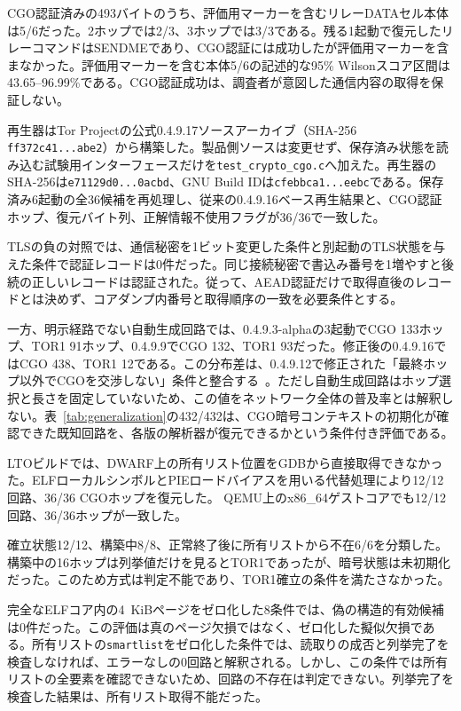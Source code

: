 \documentclass[10pt,a4paper]{ltjsarticle}
\newcommand{\code}[1]{\nolinkurl{#1}}
\newcommand{\torone}{\textsc{TOR1}}
\begin{document}
CGO認証済みの493バイトのうち、評価用マーカーを含むリレーDATAセル本体は5/6だった。2ホップでは2/3、3ホップでは3/3である。残る1起動で復元したリレーコマンドはSENDMEであり、CGO認証には成功したが評価用マーカーを含まなかった。評価用マーカーを含む本体5/6の記述的な95\% Wilsonスコア区間は43.65--96.99\%である。CGO認証成功は、調査者が意図した通信内容の取得を保証しない。

再生器はTor Projectの公式0.4.9.17ソースアーカイブ（SHA-256 \code{ff372c41...abe2}）から構築した。製品側ソースは変更せず、保存済み状態を読み込む試験用インターフェースだけを\code{test_crypto_cgo.c}へ加えた。再生器のSHA-256は\code{e71129d0...0acbd}、GNU Build IDは\code{cfebbca1...eebc}である。保存済み6起動の全36候補を再処理し、従来の0.4.9.16ベース再生結果と、CGO認証ホップ、復元バイト列、正解情報不使用フラグが36/36で一致した。

TLSの負の対照では、通信秘密を1ビット変更した条件と別起動のTLS状態を与えた条件で認証レコードは0件だった。同じ接続秘密で書込み番号を1増やすと後続の正しいレコードは認証された。従って、AEAD認証だけで取得直後のレコードとは決めず、コアダンプ内番号と取得順序の一致を必要条件とする。

一方、明示経路でない自動生成回路では、0.4.9.3-alphaの3起動でCGO 133ホップ、\torone{} 91ホップ、0.4.9.9でCGO 132、\torone{} 93だった。修正後の0.4.9.16ではCGO 438、\torone{} 12である。この分布差は、0.4.9.12で修正された「最終ホップ以外でCGOを交渉しない」条件と整合する~\cite{torrelease04912}。ただし自動生成回路はホップ選択と長さを固定していないため、この値をネットワーク全体の普及率とは解釈しない。表~\ref{tab:generalization}の432/432は、CGO暗号コンテキストの初期化が確認できた既知回路を、各版の解析器が復元できるかという条件付き評価である。

LTOビルドでは、DWARF上の所有リスト位置をGDBから直接取得できなかった。ELFローカルシンボルとPIEロードバイアスを用いる代替処理により12/12回路、36/36 CGOホップを復元した。
QEMU上のx86\_64ゲストコアでも12/12回路、36/36ホップが一致した。


確立状態12/12、構築中8/8、正常終了後に所有リストから不在6/6を分類した。
構築中の16ホップは列挙値だけを見ると\torone{}であったが、暗号状態は未初期化だった。このため方式は判定不能であり、\torone{}確立の条件を満たさなかった。

完全なELFコア内の4~KiBページをゼロ化した8条件では、偽の構造的有効候補は0件だった。この評価は真のページ欠損ではなく、ゼロ化した擬似欠損である。所有リストの\code{smartlist}をゼロ化した条件では、読取りの成否と列挙完了を検査しなければ、エラーなしの0回路と解釈される。しかし、この条件では所有リストの全要素を確認できないため、回路の不存在は判定できない。列挙完了を検査した結果は、所有リスト取得不能だった。
\end{document}
